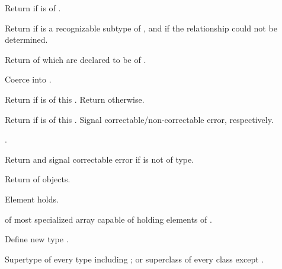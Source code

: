 \begin{LIST}{1cm}

  {
  Return \retval{\T} if  is of .
  }

  {
  Return \retval{\T} if  is a recognizable subtype of
  , and \retvalii{\NIL} if the relationship could not be
  determined. 
  }

  {
  Return  of  which are declared to be of
  . 
  }

  {
  Coerce  into .
  }

  {
  Return  if  is of this
  . Return  otherwise. 
  }

  {
  Return  if  is of this .
  Signal correctable/non-correctable error, respectively.
  }

  {
  .
  }

  {
  Return \retval{\NIL} and signal correctable error if  is
  not of {type}. 
  }

  {
  Return  of  objects.
  }

  {
  Element   holds.
  }

  {
   of most specialized array capable of holding
  elements of . 
  }

  {
  Define new type .
  }

  \IT{\T)}
  {
  Supertype of every type including ; or superclass of every
  class except .
  }


\end{LIST}
